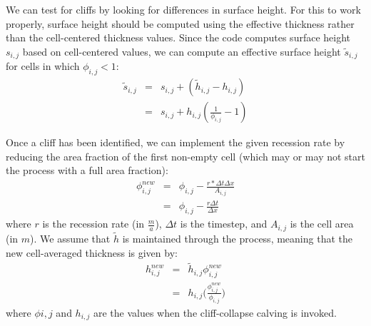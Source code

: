 \documentclass[12pt]{article}
\begin{document}
We can test for cliffs by looking for differences in surface height. For this to work properly, surface height should be computed using the effective thickness rather than the cell-centered thickness values. Since the code computes surface height $s_{i,j}$ based on cell-centered values, we can compute an effective surface height $\tilde{s}_{i,j}$ for cells in which $\phi_{i,j} < 1$:
\begin{eqnarray}
  \tilde{s}_{i,j} & = & s_{i,j} + (\tilde{h}_{i,j} - h_{i,j})  \\
  & = & s_{i,j} + h_{i,j}(\frac{1}{\phi_{i,j}} - 1) \nonumber
\end{eqnarray} 

Once a cliff has been identified, we can implement the given recession rate by reducing the area fraction of the first non-empty cell (which may or may not start the process with a full area fraction):
\begin{eqnarray}
  \phi^{new}_{i,j} & = & \phi_{i,j} - \frac{r*{\Delta t \Delta x}}{A_{i,j}} \nonumber \\
  & = &  \phi_{i,j} - \frac{r \Delta t}{\Delta x} \label{eqn:cliffCollapsePhi}
\end{eqnarray}
where $r$ is the recession rate (in $\frac{m}{a}$), $\Delta t$ is the timestep, and ${A_{i,j}}$ is the cell area (in $m$). We assume that $\tilde{h}$ is maintained through the process, meaning that the new cell-averaged thickness is given by:
\begin{eqnarray}
  h^{new}_{i,j} & = & \tilde{h}_{i,j} \phi^{new}_{i,j} \label{eqn:cliffCollapseThickness} \\
  & = & h_{i,j}\bigl(\frac{\phi^{new}_{i,j}} {\phi_{i,j}}\bigr) \nonumber
\end{eqnarray}
where $\phi{i,j}$ and $h_{i,j}$ are the values when the cliff-collapse calving is invoked.
  
\end{document}
